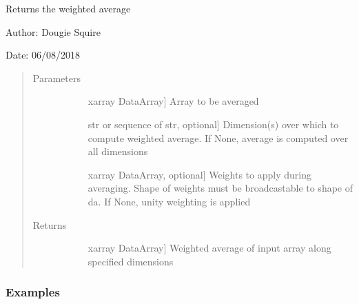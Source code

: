 \documentclass[letterpaper,10pt,english]{sphinxmanual}
\begin{document}
\begin{fulllineitems}
\label{\detokenize{utils_doc:utils.average}}
Returns the weighted average

\begin{DUlineblock}{0em}
\item[] Author: Dougie Squire
\item[] Date: 06/08/2018
\end{DUlineblock}
\begin{quote}\begin{description}
\item[{Parameters}] \leavevmode\begin{description}
\item[{}] \leavevmode{[}xarray DataArray{]}
Array to be averaged

\item[{}] \leavevmode{[}str or sequence of str, optional{]}
Dimension(s) over which to compute weighted average. If None, average is computed over all                    dimensions

\item[{}] \leavevmode{[}xarray DataArray, optional{]}
Weights to apply during averaging. Shape of weights must be broadcastable to shape of da.                    If None, unity weighting is applied

\end{description}

\item[{Returns}] \leavevmode\begin{description}
\item[{}] \leavevmode{[}xarray DataArray{]}
Weighted average of input array along specified dimensions

\end{description}

\end{description}\end{quote}
\subsubsection*{Examples}


\end{fulllineitems}
\end{document}
